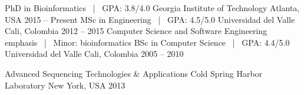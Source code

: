


\begin{cventries}



\cventry
{PhD in Bioinformatics ~|~ GPA: 3.8/4.0} %
{Georgia Institute of Technology} %
{Atlanta, USA} %
{2015 -- Present} %
{ 
}
\vspace{-2.0mm}
\cventry
{MSc in Engineering ~|~ GPA: 4.5/5.0} %
{Universidad del Valle} %
{Cali, Colombia} %
{2012 -- 2015} %
{ 
Computer Science and Software Engineering emphasis ~|~ Minor: bioinformatics \newline
}
\vspace{-2.0mm}
\cventry
{BSc in Computer Science ~|~ GPA: 4.4/5.0} %
{Universidad del Valle} %
{Cali, Colombia} %
{2005 -- 2010} %
{ 
}
\vspace{-6.0mm}

\end{cventries}


\begin{cventries}
\cventry
{Advanced Sequencing Technologies \& Applications} %
{Cold Spring Harbor Laboratory} %
{New York, USA} %
{2013} %
{ 
}
\end{cventries}
\vspace{-2.0mm}
